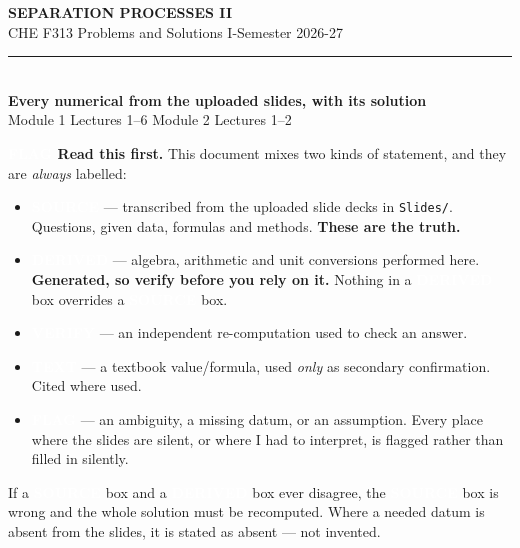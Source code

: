 \documentclass[10pt,a4paper]{article}
\newcommand{\chip}[2]{{\setlength{\fboxsep}{3pt}%
  \colorbox{#1}{\textcolor{white}{\bfseries\footnotesize #2}}}}
\newcommand{\SOURCE}{\chip{srccol}{SOURCE}}
\newcommand{\DERIVED}{\chip{devcol}{DERIVED}}
\newcommand{\VERIFY}{\chip{vercol}{VERIFY}}
\newcommand{\FLAGTAG}{\chip{flagcol}{FLAG}}
\newcommand{\TEXT}{\chip{txtcol}{TEXT}}
\begin{document}
\begin{center}
{\LARGE\bfseries\color{accent} SEPARATION PROCESSES II}\\[2pt]
{\color{accent2} CHE F313 \textperiodcentered{} Problems and Solutions \textperiodcentered{} I-Semester 2026-27}\\[4pt]
{\color{rule}\rule{0.6\linewidth}{0.8pt}}\\[6pt]
{\large\bfseries\color{accent} Every numerical from the uploaded slides, with its solution}\\[3pt]
{\color{accent2} Module 1 Lectures 1--6 \textperiodcentered{} Module 2 Lectures 1--2}
\end{center}

\vspace{2mm}
\begin{flagres}
\textbf{\FLAGTAG{} Read this first.} This document mixes two kinds of statement,
and they are \emph{always} labelled:
\begin{itemize}
  \item \SOURCE{} --- transcribed from the uploaded slide decks in \texttt{Slides/}.
        Questions, given data, formulas and methods. \textbf{These are the truth.}
  \item \DERIVED{} --- algebra, arithmetic and unit conversions performed here.
        \textbf{Generated, so verify before you rely on it.} Nothing in a
        \DERIVED{} box overrides a \SOURCE{} box.
  \item \VERIFY{} --- an independent re-computation used to check an answer.
  \item \TEXT{} --- a textbook value/formula, used \emph{only} as secondary
        confirmation. Cited where used.
  \item \FLAGTAG{} --- an ambiguity, a missing datum, or an assumption. Every
        place where the slides are silent, or where I had to interpret, is
        flagged rather than filled in silently.
\end{itemize}
If a \SOURCE{} box and a \DERIVED{} box ever disagree, the \SOURCE{} box is wrong
and the whole solution must be recomputed. Where a needed datum is absent from
the slides, it is stated as absent --- not invented.
\end{flagres}
\end{document}
